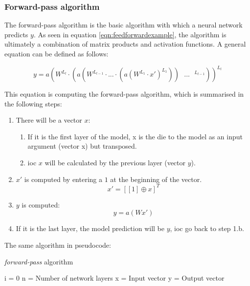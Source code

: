 \subsubsection{Forward-pass algorithm}\label{feedforward}

The forward-pass algorithm is the basic algorithm with which a neural network predicts $y$. As seen in equation \ref{eqn:feedforwardexample}, the algorithm is ultimately a combination of matrix products and activation functions. A general equation can be defined as follows:

\begin{equation}
    y = a(W^{L_l} \cdot (a(W^{L_{l-1}} \cdot ... \cdot (a(W^{L_1} \cdot x')^{L_1})) \text{ } ... \text{ } ^{L_{l-1}}))^{L_l}
    \label{eqn:feedforward}
\end{equation}

This equation is computing the forward-pass algorithm, which is summarised in the following steps:

\begin{enumerate}
\item There will be a vector $x$:
\begin{enumerate}
    \item If it is the first layer of the model, x is the die to the model as an input argument (vector x) but transposed.
    \item \acrshort{ioc} $x$ will be calculated by the previous layer (vector $y$).
\end{enumerate}
\item $x'$ is computed by entering a $1$ at the beginning of the vector.
\begin{equation}
  x' = [[1] \oplus x]^T
\end{equation}

\item $y$ is computed:
\begin{equation}
  y = a(Wx')
\end{equation}
\item If it is the last layer, the model prediction will be $y$, \acrshort{ioc} go back to step 1.b.
\end{enumerate}

The same algorithm in pseudocode:

\begin{algorithm}[H]
\caption{\textit{forward-pass} algorithm}
\SetAlgoLined
{}
 i = 0\;
 n = Number of network layers\;
 x = Input vector\;
 y = Output vector\;
\end{algorithm}


